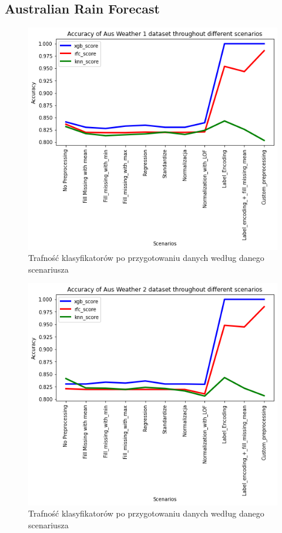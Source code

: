 \documentclass{book}
\begin{document}
\subsection{Australian Rain Forecast}

\begin{figure}[H]
\centerline{\includegraphics{Aus_Weather_1}}
\centering
\caption{Trafność klasyfikatorów po przygotowaniu danych 
według danego scenariusza}
\end{figure}
    
\begin{figure}[H]
\centerline{\includegraphics{Aus_Weather_2}}
\centering
\caption{Trafność klasyfikatorów po przygotowaniu danych 
według danego scenariusza}
\end{figure}
    
\end{document}
